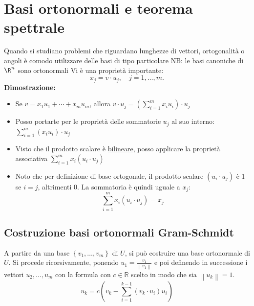 \documentclass[12pt,a4paper,oneside]{article}
\begin{document}
\section{Basi ortonormali e teorema spettrale}
Quando si studiano problemi che riguardano lunghezze di vettori, ortogonalità o angoli è comodo utilizzare delle basi di tipo particolare
NB: le basi canoniche di $ \R^{n} $ sono ortonormali
\vskip3mm
Vi è una proprietà importante:
\[
	x_j=v \cdot u_j, \quad j=1, \ldots, m .
\]
\textbf{Dimostrazione:}
\begin{itemize}
	\item Se $v=x_1 u_1+\cdots+x_m u_m$, allora $v \cdot u_j=\left( \sum_{i=1}^m x_iu_i \right)\cdot u_j$
	\item Posso portarte per le proprietà delle sommatorie $ u_j $ al suo interno: $ \sum_{i=1}^{m} \left( x_i u_i \right) \cdot u_j $
	\item Visto che il prodotto scalare è \underline{bilineare}, posso applicare la proprietà associativa $  \sum_{i=1}^{m}  x_i \left( u_i \cdot u_j \right) $
	\item Noto che per definizione di base ortogonale, il prodotto scalare $ \left( u_i \cdot u_j \right)  $ è 1 se $ i=j $, altrimenti 0. La sommatoria è quindi uguale a $ x_j $:
	      \[
		      \sum_{i=1}^{m} x_i \left( u_i \cdot u_j \right) = x_j
	      \]
\end{itemize}
\subsection{Costruzione basi ortonormali Gram-Schmidt}
A partire da una base $\left\{v_1, \ldots, v_m\right\}$ di $U$, si può costruire una base ortonormale di $U$. Si procede ricorsivamente, ponendo $u_1=\frac{v_1}{\left\|v_1\right\|}$ e poi definendo in successione i vettori $u_2, \ldots, u_m$ con la formula
con $c \in \mathbb{R}$ scelto in modo che sia $\left\|u_k\right\|=1$.
\[
	u_k=c\left(v_k-\sum_{i=1}^{k-1}\left(v_k \cdot u_i\right) u_i\right)
\]
\end{document}
